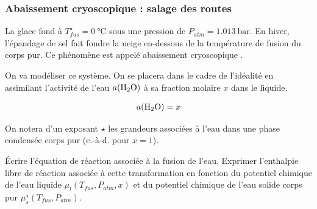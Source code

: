 \subsubsection{Abaissement cryoscopique : salage des routes}
\label{subsubsection:relation_potentiel_chimique_melange-abaissement_cryoscopique}

\setcounter{equation}{0}
\setcounter{Q}{0}

La glace fond à $T^\star_{fus} = \SI{0}{\celsius}$ sous une pression de $P_{atm} = \SI{1.013}{\bar}$. En hiver, l'épandage de sel fait fondre la neige en-dessous de la température de fusion du corps pur. Ce phénomène est appelé \og abaissement cryoscopique \fg{}.

On va modéliser ce système. On se placera dans le cadre de l'idéalité en assimilant l'activité de l'eau $a ( \ce{H2O} )$ à sa fraction molaire $x$ dans le liquide.

\begin{align*}
a ( \ce{H2O} ) = x
\end{align*}

On notera d'un exposant $\star$ les grandeurs associées à l'eau dans une phase condensée corps pur (c.-à-d. pour $x = 1$).

\Q\label{Q:01} \'{E}crire l'équation de réaction associée à la fusion de l'eau. Exprimer l'enthalpie libre de réaction associée à cette transformation en fonction du potentiel chimique de l'eau liquide $\mu_l (T_{fus}, P_{atm}, x)$ et du potentiel chimique de l'eau solide corps pur $\mu^\star_s (T_{fus}, P_{atm})$.

